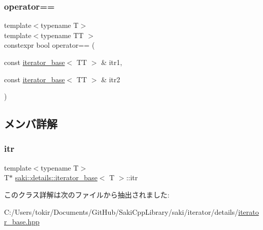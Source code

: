\subsubsection{\texorpdfstring{operator==}{operator==}}
{\footnotesize\ttfamily template$<$typename T$>$ \\
template$<$typename TT $>$ \\
constexpr bool operator== (\begin{DoxyParamCaption}\item[{const \mbox{\hyperlink{classsaki_1_1details_1_1iterator__base}{iterator\+\_\+base}}$<$ TT $>$ \&}]{itr1,  }\item[{const \mbox{\hyperlink{classsaki_1_1details_1_1iterator__base}{iterator\+\_\+base}}$<$ TT $>$ \&}]{itr2 }\end{DoxyParamCaption})\hspace{0.3cm}{\ttfamily [friend]}}



\subsection{メンバ詳解}
\mbox{\label{classsaki_1_1details_1_1iterator__base_a26c42413a1c967669da4a52b1fe65f13}} 
\subsubsection{\texorpdfstring{itr}{itr}}
{\footnotesize\ttfamily template$<$typename T$>$ \\
T$\ast$ \mbox{\hyperlink{classsaki_1_1details_1_1iterator__base}{saki\+::details\+::iterator\+\_\+base}}$<$ T $>$\+::itr\hspace{0.3cm}{\ttfamily [protected]}}



このクラス詳解は次のファイルから抽出されました\+:\begin{DoxyCompactItemize}
\item 
C\+:/\+Users/tokir/\+Documents/\+Git\+Hub/\+Saki\+Cpp\+Library/saki/iterator/details/\mbox{\hyperlink{iterator__base_8hpp}{iterator\+\_\+base.\+hpp}}\end{DoxyCompactItemize}
